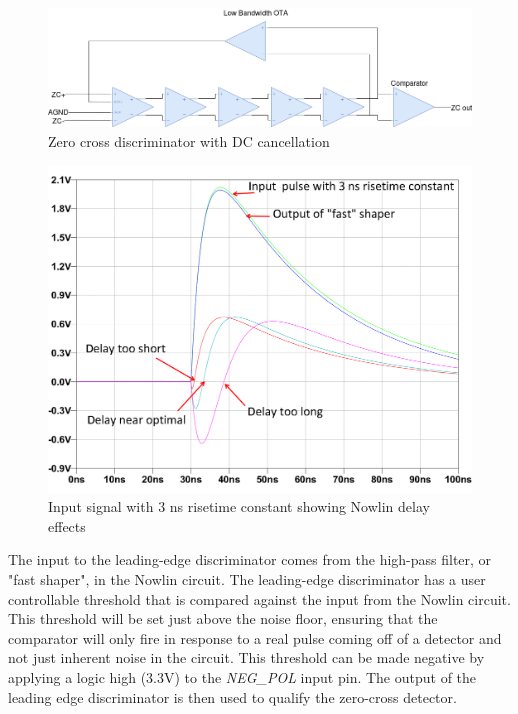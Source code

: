\documentclass[12pt,oneside,final]{siuethesis}
\theoremstyle{definition}
\begin{document}
\begin{figure}[htbp!]
\centering
\includegraphics[scale=.45,keepaspectratio=true]{./ch2_figures/zcd.png} 
\caption{Zero cross discriminator with DC cancellation}
\label{fig:zcd}
\end{figure}

\begin{figure}[htbp!]
\centering
\includegraphics[scale=.4,keepaspectratio=true]{./ch2_figures/nowlin.png} 
\caption{Input signal with 3 ns risetime constant showing Nowlin delay effects}
\label{fig:nowlinout}
\end{figure}



\par The input to the leading-edge discriminator comes from the high-pass filter, or "fast shaper", in the Nowlin circuit. The leading-edge discriminator has a user controllable threshold that is compared against the input from the Nowlin circuit. This threshold will be set just above the noise floor, ensuring that the comparator will only fire in response to a real pulse coming off of a detector and not just inherent noise in the circuit. This threshold can be made negative by applying a logic high (3.3V) to the \emph{NEG\_POL} input pin. The output of the leading edge discriminator is then used to qualify the zero-cross detector.
\end{document}
